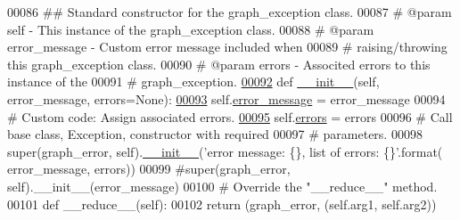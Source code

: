 \begin{DoxyCode}
00086     \textcolor{comment}{##  Standard constructor for the graph\_exception class.}
00087     \textcolor{comment}{#   @param self - This instance of the graph\_exception class.}
00088     \textcolor{comment}{#   @param error\_message - Custom error message included when}
00089     \textcolor{comment}{#       raising/throwing this graph\_exception class.}
00090     \textcolor{comment}{#   @param errors - Associted errors to this instance of the}
00091     \textcolor{comment}{#       graph\_exception.}
\hypertarget{graph__error_8py_source_l00092}{}\hyperlink{classutilities_1_1custom__exceptions_1_1graph__error_1_1graph__error_af1cd1f51b69ad2fc3af0521ae2922535}{00092}     \textcolor{keyword}{def }\hyperlink{classutilities_1_1custom__exceptions_1_1graph__error_1_1graph__error_af1cd1f51b69ad2fc3af0521ae2922535}{\_\_init\_\_}(self, error\_message, errors=None):
\hypertarget{graph__error_8py_source_l00093}{}\hyperlink{classutilities_1_1custom__exceptions_1_1graph__error_1_1graph__error_a98eabd7ef4fec2794e8b88e3af478de6}{00093}         self.\hyperlink{classutilities_1_1custom__exceptions_1_1graph__error_1_1graph__error_a98eabd7ef4fec2794e8b88e3af478de6}{error\_message} = error\_message
00094         \textcolor{comment}{# Custom code: Assign associated errors.}
\hypertarget{graph__error_8py_source_l00095}{}\hyperlink{classutilities_1_1custom__exceptions_1_1graph__error_1_1graph__error_abc34ad82ec3f8374e1ff60c5c888a3eb}{00095}         self.\hyperlink{classutilities_1_1custom__exceptions_1_1graph__error_1_1graph__error_abc34ad82ec3f8374e1ff60c5c888a3eb}{errors} = errors
00096         \textcolor{comment}{# Call base class, Exception, constructor with required}
00097         \textcolor{comment}{#   parameters.}
00098         super(graph\_error, self).\hyperlink{classutilities_1_1custom__exceptions_1_1graph__error_1_1graph__error_af1cd1f51b69ad2fc3af0521ae2922535}{\_\_init\_\_}(\textcolor{stringliteral}{'error message: \{\}, list of errors: \{\}'}.format(
      error\_message, errors))
00099         \textcolor{comment}{#super(graph\_error, self).\_\_init\_\_(error\_message)}
00100         \textcolor{comment}{# Override the "\_\_reduce\_\_" method.}
00101         \textcolor{keyword}{def }\_\_reduce\_\_(self):
00102             \textcolor{keywordflow}{return} (graph\_error, (self.arg1, self.arg2))
\end{DoxyCode}
